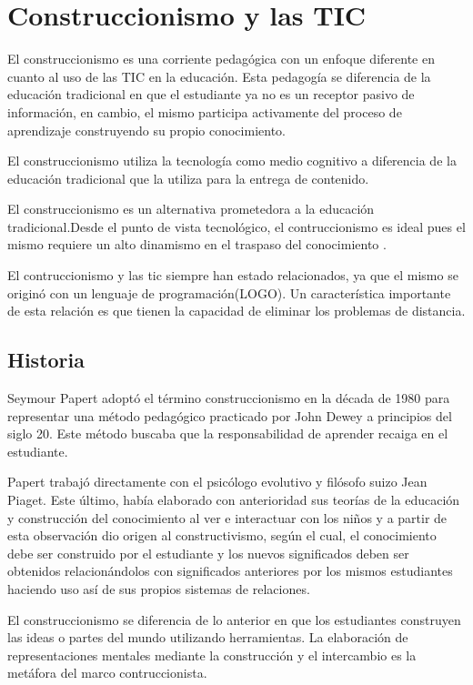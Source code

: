 \section{Construccionismo y las TIC}

El construccionismo es una corriente pedagógica con un enfoque diferente en
cuanto al uso de las TIC en la educación. Esta pedagogía se diferencia de la
educación tradicional en que el estudiante ya no es un receptor pasivo de
información, en cambio, el mismo participa activamente del proceso de
aprendizaje construyendo su propio conocimiento. 

El construccionismo utiliza la tecnología como medio cognitivo  a diferencia de
la educación tradicional que la utiliza para la entrega de contenido. 

El construccionismo es un alternativa prometedora a la educación
tradicional.Desde el punto de vista tecnológico, el contruccionismo es ideal
pues el mismo requiere un alto dinamismo en el traspaso del conocimiento
\cite{sasha:construtivism}. 

El contruccionismo y las \Gls{tic} siempre han estado relacionados, ya que el
mismo se originó con un lenguaje de programación(LOGO)\cite{ict:ttc}. Un
característica importante de esta relación es que tienen la capacidad de
eliminar los problemas de distancia\cite{mariluz:seiousgames}.


\subsection{Historia}

Seymour Papert adoptó el término construccionismo en la década de 1980 para
representar una método pedagógico practicado por John Dewey a principios del
siglo 20. Este método buscaba que la responsabilidad de aprender recaiga en el
estudiante. 

Papert trabajó directamente con el psicólogo evolutivo y filósofo suizo Jean
Piaget. Este último, había elaborado con anterioridad sus teorías de la
educación y construcción del conocimiento al ver e interactuar con los niños y a
partir de esta observación dio origen al constructivismo, según el cual, el
conocimiento debe ser construido por el estudiante y los nuevos significados
deben ser obtenidos relacionándolos con significados anteriores por los mismos
estudiantes haciendo uso así de sus propios sistemas de relaciones.

El construccionismo se diferencia de lo anterior en que los estudiantes
construyen las ideas o partes del mundo utilizando herramientas. La elaboración
de representaciones mentales mediante la construcción y el intercambio es la
metáfora del marco contruccionista. 

